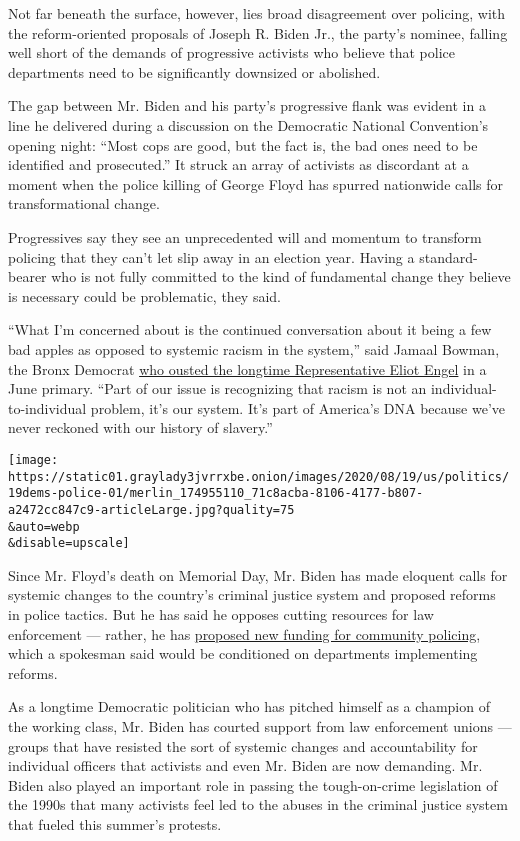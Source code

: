 Not far beneath the surface, however, lies broad disagreement over
policing, with the reform-oriented proposals of Joseph R. Biden Jr., the
party's nominee, falling well short of the demands of progressive
activists who believe that police departments need to be significantly
downsized or abolished.

The gap between Mr. Biden and his party's progressive flank was evident
in a line he delivered during a discussion on the Democratic National
Convention's opening night: ``Most cops are good, but the fact is, the
bad ones need to be identified and prosecuted.'' It struck an array of
activists as discordant at a moment when the police killing of George
Floyd has spurred nationwide calls for transformational change.

Progressives say they see an unprecedented will and momentum to
transform policing that they can't let slip away in an election year.
Having a standard-bearer who is not fully committed to the kind of
fundamental change they believe is necessary could be problematic, they
said.

``What I'm concerned about is the continued conversation about it being
a few bad apples as opposed to systemic racism in the system,'' said
Jamaal Bowman, the Bronx Democrat
\href{https://www.nytimes3xbfgragh.onion/2020/07/17/nyregion/jamaal-bowman-eliot-engel.html}{who
ousted the longtime Representative Eliot Engel} in a June primary.
``Part of our issue is recognizing that racism is not an
individual-to-individual problem, it's our system. It's part of
America's DNA because we've never reckoned with our history of
slavery.''

\texttt{[image: https://static01.graylady3jvrrxbe.onion/images/2020/08/19/us/politics/19dems-police-01/merlin\_174955110\_71c8acba-8106-4177-b807-a2472cc847c9-articleLarge.jpg?quality=75\\\&auto=webp\\\&disable=upscale]}

Since Mr. Floyd's death on Memorial Day, Mr. Biden has made eloquent
calls for systemic changes to the country's criminal justice system and
proposed reforms in police tactics. But he has said he opposes cutting
resources for law enforcement --- rather, he has
\href{https://www.nytimes3xbfgragh.onion/2020/06/26/us/politics/defund-police-protests-democrats.html}{proposed
new funding for community policing}, which a spokesman said would be
conditioned on departments implementing reforms.

As a longtime Democratic politician who has pitched himself as a
champion of the working class, Mr. Biden has courted support from law
enforcement unions --- groups that have resisted the sort of systemic
changes and accountability for individual officers that activists and
even Mr. Biden are now demanding. Mr. Biden also played an important
role in passing the tough-on-crime legislation of the 1990s that many
activists feel led to the abuses in the criminal justice system that
fueled this summer's protests.

